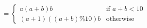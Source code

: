 \documentclass[preview]{standalone}
\begin{document}
\begin{align*}
=\begin{cases}a(a+b)b & \text{if } a + b < 10 \\(a + 1)((a + b) \% 10)b & \text{otherwise}\end{cases}
\end{align*}
\end{document}

